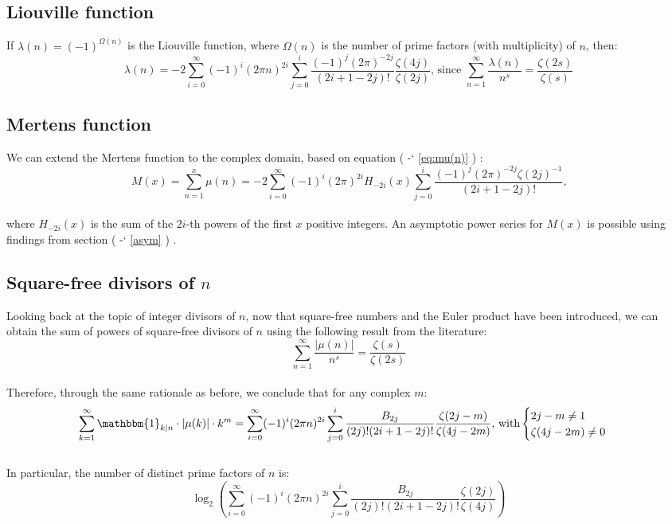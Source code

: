 \documentclass[12pt]{article}
\newcommand*{\eqrefe}[1]{%
\begingroup
(\color{BrickRed}
\romannumeral-`\x %
\setcitestyle{numbers}%
\ref{eq:#1}%
\endgroup
)\ignorespacesafterend
}
\newcommand*{\secrefe}[1]{%
\begingroup
(\color{Aquamarine}
\romannumeral-`\x %
\setcitestyle{numbers}%
\ref{#1}%
\endgroup
)\ignorespacesafterend
}
\begin{document}
\subsection{Liouville function}
If $\lambda(n)=(-1)^{\Omega(n)}$ is the Liouville function, where $\Omega(n)$ is the number of prime factors (with multiplicity) of $n$, then:
\begin{equation} \nonumber
\lambda(n)=-2\sum_{i=0}^{\infty} (-1)^{i}(2\pi n)^{2i}\sum_{j=0}^{i}\frac{(-1)^j (2\pi)^{-2j}}{(2i+1-2j)!}\frac{\zeta(4j)}{\zeta(2j)} \text{, since }\sum_{n=1}^{\infty}\frac{\lambda(n)}{n^{s}}=\frac{\zeta{(2s)}}{\zeta(s)}
\end{equation}

\subsection{Mertens function}
We can extend the Mertens function to the complex domain, based on equation \eqrefe{mu(n)}:
\begin{equation} \nonumber
M(x)=\sum_{n=1}^{x}\mu(n)=-2\sum_{i=0}^{\infty} (-1)^i (2\pi)^{2i}H_{-2i}(x)\sum_{j=0}^{i} \frac{(-1)^j (2\pi)^{-2j}\zeta(2j)^{-1}}{(2i+1-2j)!} \text{,}
\end{equation}\\
\noindent where $H_{-2i}(x)$ is the sum of the $2i$-th powers of the first $x$ positive integers. An asymptotic power series for $M(x)$ is possible using findings from section \secrefe{asym}.

\subsection{Square-free divisors of $n$} \label{sq_free_divs}
Looking back at the topic of integer divisors of $n$, now that square-free numbers and the Euler product have been introduced, we can obtain the sum of powers of square-free divisors of $n$ using the following result from the literature:
\begin{equation} \nonumber
\sum_{n=1}^{\infty}\frac{|\mu(n)|}{n^{s}}=\frac{\zeta{(s)}}{\zeta(2s)} 
\end{equation}\\
\indent Therefore, through the same rationale as before, we conclude that for any complex $m$:
\begin{equation} \nonumber
\sum_{k=1}^{\infty}\mathbbm{1}_{k|n}\cdot |\mu(k)|\cdot k^{m}=\sum_{i=0}^{\infty}(-1)^i (2\pi n)^{2i}\sum_{j=0}^{i}\frac{B_{2j}}{(2j)!(2i+1-2j)!}\frac{\zeta(2j-m)}{\zeta(4j-2m)} \text{, with} \begin{cases} \nonumber 
2j-m\neq 1 & \text{}\\
\zeta(4j-2m) \neq 0 & \text{} 
\end{cases}
\end{equation}\\
\indent In particular, the number of distinct prime factors of $n$ is:
\begin{equation} \nonumber
\log_{2}\left(\sum_{i=0}^{\infty}(-1)^i (2\pi n)^{2i}\sum_{j=0}^{i} \frac{B_{2j}}{(2j)!(2i+1-2j)!}\frac{\zeta(2j)}{\zeta(4j)}\right)
\end{equation}
\end{document}
